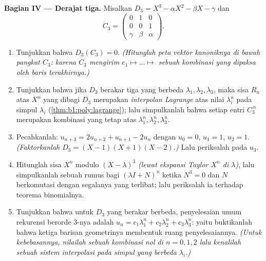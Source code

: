 \begin{problem}
\medskip
\noindent\textbf{Bagian IV --- Derajat tiga.} Misalkan $D_3 = X^3 -
\alpha X^2 - \beta X - \gamma$ dan
\[
C_3 = \begin{pmatrix} 0 & 1 & 0\\ 0 & 0 & 1\\ \gamma & \beta &
\alpha \end{pmatrix}.
\]
\begin{enumerate}[resume]
  \item Tunjukkan bahwa $D_3(C_3) = 0$. \emph{(Hitunglah peta
        vektor  kanoniknya di bawah pangkat $C_3$: karena
         $C_3$ mengirim $e_1 \mapsto \dots \mapsto$ sebuah
        kombinasi yang dipaksa oleh baris terakhirnya.)}
  \item Tunjukkan bahwa jika $D_3$ berakar tiga yang berbeda $\lambda_1,
        \lambda_2, \lambda_3$, maka sisa $R_n$ atas $X^n$
        yang dibagi $D_3$ merupakan \emph{interpolan Lagrange} atas
        nilai $\lambda_i^n$ pada simpul $\lambda_i$
        (\cref{thm:b1:poly:lagrange}); lalu simpulkanlah bahwa setiap entri
        $C_3^{\,n}$ merupakan kombinasi  yang tetap atas
        $\lambda_1^n, \lambda_2^n, \lambda_3^n$.
  \item Pecahkanlah: $u_{n+3} = 2u_{n+2} + u_{n+1} - 2u_n$ dengan $u_0 =
        0$, $u_1 = 1$, $u_2 = 1$. \emph{(Faktorkanlah $D_3 = (X - 1)(X
        + 1)(X - 2)$.)} Lalu periksalah pada $u_3$.
  \item Hitunglah sisa $X^n$ modulo $(X -
        \lambda)^3$ \emph{(lewat ekspansi Taylor $X^n$ di
        $\lambda$)}, lalu simpulkanlah sebuah rumus bagi $(\lambda I +
        N)^n$ ketika $N^3 = 0$ dan $N$ berkomutasi dengan segalanya yang
        terlibat; lalu periksalah ia terhadap teorema binomialnya.
  \item Tunjukkan bahwa untuk $D_3$ yang berakar berbeda, penyelesaian umum
        rekurensi berorde $3$-nya adalah $u_n = c_1
        \lambda_1^n + c_2\lambda_2^n + c_3\lambda_3^n$: yaitu buktikanlah
        bahwa ketiga barisan geometrinya membentuk 
        ruang penyelesaiannya. \emph{(Untuk kebebasannya, nilailah sebuah
        kombinasi nol di $n = 0, 1, 2$ lalu kenalilah sebuah
        sistem interpolasi pada simpul yang berbeda
        $\lambda_i$.)}
\end{enumerate}


\end{problem}
